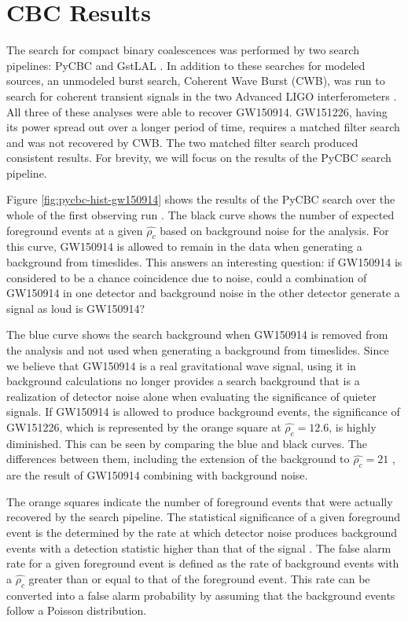 \section{CBC Results}

The search for compact binary
coalescences was performed by two search pipelines: 
PyCBC \cite{pycbc-github,Usman:2015kfa} and 
GstLAL \cite{gstlal-methods}. 
In addition to these searches for modeled sources, an unmodeled 
burst search, Coherent Wave Burst (CWB), was run to search for coherent 
transient signals in the two Advanced LIGO interferometers \cite{GW150914-BURST}. 
All three of these analyses were able to recover GW150914. GW151226, 
having its power spread out over a longer period of time, requires a 
matched filter search and was not recovered by CWB. The two matched filter 
search produced consistent results. 
For brevity, we will focus on the results of the PyCBC search pipeline.

Figure \ref{fig:pycbc-hist-gw150914} shows the results of the PyCBC search 
over the whole of the first observing run \cite{GW151226}. The black curve shows the 
number of expected foreground events at a given $\hat{\rho_c}$ based on 
background noise for the analysis. For this curve, GW150914 is 
allowed to remain in the data when generating a background from timeslides. 
This answers an interesting question: if GW150914 is considered to be a 
chance coincidence due to noise, could a combination of GW150914 in 
one detector and background noise in the other detector generate a 
signal as loud is GW150914?

The blue curve shows the search background when GW150914 is removed 
from the analysis and not used when generating a background from 
timeslides. Since we believe that GW150914 is a real gravitational wave 
signal, using it in background calculations no longer provides a 
search background that is a realization of detector noise alone 
when evaluating the significance of quieter signals. 
If GW150914 is allowed to produce background events, the 
significance of GW151226, which is represented by the orange square at 
$\hat{\rho_c} = 12.6$, is highly diminished. This can be seen by comparing 
the blue and black curves. The differences between them, including the 
extension of the background to $\hat{\rho_c} = 21$ , are the result 
of GW150914 combining with background noise.

The orange squares indicate the 
number of foreground events that were actually recovered by the search 
pipeline. 
The statistical significance of a given foreground event is 
the determined by the rate at which detector noise produces background 
events with a detection statistic higher than that of the signal 
\cite{GW150914-CBC}. The false alarm rate for a given foreground 
event is defined as the rate of background events with a $\hat{\rho_c}$ 
greater than or equal to that of the foreground event. This rate 
can be converted into a false alarm probability by assuming that the 
background events follow a Poisson distribution. 

